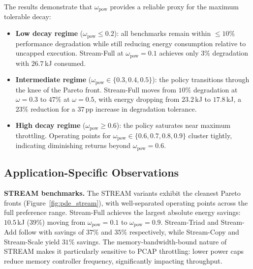 The results demonstrate that $\omega_\text{pow}$ provides a reliable proxy for the maximum tolerable decay:
\begin{itemize}
  \item \textbf{Low decay regime} ($\omega_\text{pow} \leq 0.2$): all benchmarks remain within $\leq\!10\%$ performance degradation while still reducing energy consumption relative to uncapped execution. Stream-Full at $\omega_\text{pow}=0.1$ achieves only $3\%$ degradation with $26.7$\,kJ consumed.
  \item \textbf{Intermediate regime} ($\omega_\text{pow} \in \{0.3, 0.4, 0.5\}$): the policy transitions through the knee of the Pareto front. Stream-Full moves from $10\%$ degradation at $\omega=0.3$ to $47\%$ at $\omega=0.5$, with energy dropping from $23.2$\,kJ to $17.8$\,kJ, a $23\%$ reduction for a $37$\,pp increase in degradation tolerance.
  \item \textbf{High decay regime} ($\omega_\text{pow} \geq 0.6$): the policy saturates near maximum throttling. Operating points for $\omega_\text{pow} \in \{0.6, 0.7, 0.8, 0.9\}$ cluster tightly, indicating diminishing returns beyond $\omega_\text{pow} = 0.6$.
\end{itemize}

\subsection{Application-Specific Observations}

\noindent\textbf{STREAM benchmarks.}
The STREAM variants exhibit the cleanest Pareto fronts (Figure~\ref{fig:pde_stream}), with well-separated operating points across the full preference range. Stream-Full achieves the largest absolute energy savings: $10.5$\,kJ (39\%) moving from $\omega_\text{pow}=0.1$ to $\omega_\text{pow}=0.9$. Stream-Triad and Stream-Add follow with savings of $37\%$ and $35\%$ respectively, while Stream-Copy and Stream-Scale yield $31\%$ savings. The memory-bandwidth-bound nature of STREAM makes it particularly sensitive to PCAP throttling: lower power caps reduce memory controller frequency, significantly impacting throughput.

